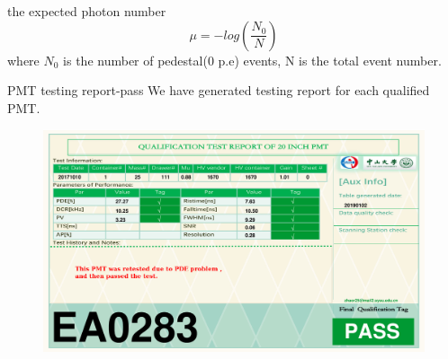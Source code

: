 \documentclass[11pt,compress,xcolor=x11names,UTF8]{beamer}
\begin{document}
\begin{frame}{ the expected photon number}
\begin{equation}
	\mu=-log(\frac{N_{0}}{N})
\end{equation}
	where $N_{0}$ is the number of pedestal(0 p.e) events, N is the total event number.
\end{frame}
\begin{frame}{PMT testing report-pass}
We have generated testing report for each qualified PMT.
\vspace{-.2cm}
\begin{figure}
\centering
\includegraphics[width=1.0\textwidth]{figures/SN_EA0283_pde1_dcr1_HV1_pv1_rt1_tag1.png}
\end{figure}
\end{frame}
%
%
\end{document}
